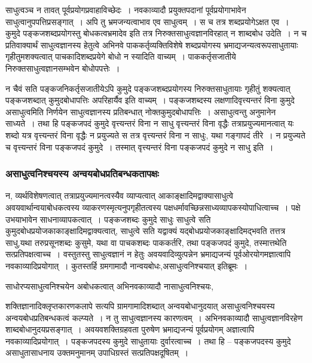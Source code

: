 				साधुत्वञ्च न तावत् पूर्वप्रयोगप्रवाहाविच्छेदः~। नवकाव्यादौ प्रयुक्तपदानां पूर्वप्रयोगाभावेन साधुत्वानुपपत्तिप्रसङ्गात्~। अपि तु भ्रमजन्यत्वाभाव एव साधुत्वम्~। स च तत्र शब्दप्रयोगेऽक्षत एव~। कुमुदे पङ्कजशब्दप्रयोगस्तु बोधकत्वभ्रमादेव इति तत्र निरुक्तसाधुत्वज्ञानविरहात् न शाब्दबोध उदेति~। न च प्रतिवाक्यार्थं साधुत्वज्ञानस्य हेतुत्वे अभिनवे पाककर्तृव्यक्तिविशेषे शब्दप्रयोगस्य भ्रमाद्यजन्यत्वरूपसाधुतायाः गृहीतुमशक्यत्वात् पाचकादिशब्दप्रयेगे बोधो न स्यादिति वाच्यम्~। पाककर्तृसजातीये निरुक्तसाधुत्वज्ञानसम्भवेन बोधोपपत्तेः~। 
	
				न चैवं सति पङ्कजनिकर्तृसजातीयेऽपि कुमुदे पङ्कजशब्दप्रयोगस्य निरुक्तसाधुतायाः गृहीतुं शक्यत्वात् पङ्कजशब्दात् कुमुदबोधापत्तिः अपरिहार्यैव इति वाच्यम्~। पङ्कजशब्दस्य लक्षणादिवृत्त्यन्तरं विना कुमुदे असाधुत्वमिति निर्णयेन साधुत्वज्ञानस्य प्रतिबन्धात् नोक्तकुमुदबोधापत्तिः~। असाधुत्वन्तु अनुमानेन साध्यते~। तथा हि पङ्कजपदं कुमुदे वृत्त्यन्तरं विना न साधु वृत्त्यन्तरं विना वृद्धैः तत्राप्रयुज्यमानत्वात् यः शब्दो यत्र वृत्त्यन्तरं विना वृद्धैः न प्रयुज्यते स तत्र वृत्त्यन्तरं विना न साधुः, यथा गङ्गापदं तीरे~। न प्रयुज्यते च वृत्त्यन्तरं विना पङ्कजपदं कुमुदे~। तस्मात् वृत्त्यन्तरं विना पङ्कजपदं कुमुदे न साधु इति~। 
			
			\subsubsection{असाधुत्वनिश्चयस्य अन्वयबोधप्रतिबन्धकतापक्षः}
			
				\begin{small}
			
					न, व्यर्थविशेषणत्वात् तत्राप्रयुज्यमानत्वस्यैव व्याप्यत्वात् आकाङ्क्षादिमद्वाक्यासाधुत्वे अवयवार्थान्वयाबोधकत्वस्य व्याकरणस्मृत्यनुपगृहीतत्वस्य पक्षधर्मावच्छिन्नसाध्यव्यापकस्योपाधित्वाच्च~। पक्षे उभयाभावेन साधनाव्यापकत्वात्~। पङ्कजशब्दः कुमुदे साधुः साधुत्वे सति कुमुदबोधप्रयोजकाकाङ्क्षादिमद्वाक्यत्वात्, साधुत्वे सति यद्वाक्यं यद्बोधप्रयोजकाङ्क्षादिमद्भवति तत्तत्र साधु,यथा तरुप्रसूनशब्दः कुसुमे, यथा वा पाचकशब्दः पाककर्तरि, तथा पङ्कजपदं कुमुदे, तस्मात्तथेति सत्प्रतिपक्षत्वाच्च~। वस्तुतस्तु साधुत्वज्ञानं न हेतुः अवयवादिव्युत्पन्नेन भ्रमाद्यजन्यं पूर्वओरयोगमज्ञात्वापि नवकाव्यादिप्रयोगात्~। कुतस्तर्हि ग्रमगामादौ नान्वयबोधः,असाधुत्वनिश्चयात् इतिब्रूमः~। 
	
					साधोरप्यसाधुत्वनिश्चयेन अबोधकत्वात् अभिनवकाव्यादौ नासाधुत्वनिश्चयः, 
				\end{small}
			
				शक्तिज्ञानादिक्लृप्तकारणकलापे सत्यपि ग्रामगामादिशब्दात् अन्वयबोधानुदयात् असाधुत्वनिश्चयस्य अन्वयबोधप्रतिबन्धकत्वं कल्प्यते~। न तु साधुत्वज्ञानस्य कारणत्वम्~। अभिनवकाव्यादौ साधुत्वज्ञानविरहेण शाब्दबोधानुदयप्रसङ्गात्~। अवयवशक्तिग्रहवता पुरुषेण भ्रमाद्यजन्यं पूर्वप्रयोगम् अज्ञात्वापि नवकाव्यादिप्रयोगात्~। पङ्कजपदस्य कुमुदे साधुतायाः दुर्वारत्वाच्च~। तथा हि – पङ्कजपदस्य कुमुदे असाधुतासाधनाय  उक्तमनुमानम् उपाधिग्रस्तं सत्प्रतिपक्षदूषितम्~।
	
